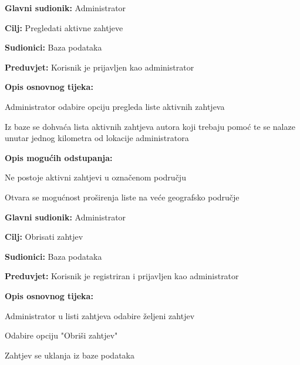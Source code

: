 \noindent {}
\begin{packed_item}
	\item \textbf{Glavni sudionik: }Administrator
	\item  \textbf{Cilj:} Pregledati aktivne zahtjeve
	\item  \textbf{Sudionici:} Baza podataka
	\item  \textbf{Preduvjet:} Korisnik je prijavljen kao administrator
	\item  \textbf{Opis osnovnog tijeka:}
	\item[] \begin{packed_enum}
		\item Administrator odabire opciju pregleda liste aktivnih zahtjeva
		\item Iz baze se dohvaća lista aktivnih zahtjeva autora koji trebaju pomoć te se nalaze unutar jednog kilometra od lokacije administratora
	\end{packed_enum}
	\item  \textbf{Opis mogućih odstupanja:}
	\item[] \begin{packed_item}
		\item[2.a] Ne postoje aktivni zahtjevi u označenom području
		\item[] \begin{packed_enum}
			\item Otvara se mogućnost proširenja liste na veće geografsko područje
		\end{packed_enum}
	\end{packed_item}
\end{packed_item}
\newpage
\noindent {}
\begin{packed_item}
	\item \textbf{Glavni sudionik: }Administrator
	\item  \textbf{Cilj:} Obrisati zahtjev
	\item  \textbf{Sudionici:} Baza podataka
	\item  \textbf{Preduvjet:} Korisnik je registriran i prijavljen kao administrator
	\item  \textbf{Opis osnovnog tijeka:}
	\item[] \begin{packed_enum}
		\item Administrator u listi zahtjeva odabire željeni zahtjev
		\item Odabire opciju "Obriši zahtjev"
		\item Zahtjev se uklanja iz baze podataka
	\end{packed_enum}
\end{packed_item}

